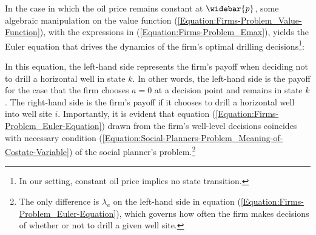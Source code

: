In the case in which the oil price remains constant at $\widebar{p}$, some algebraic manipulation on the value function (\ref{Equation:Firms-Problem_Value-Function}), with the expressions in (\ref{Equation:Firms-Problem_Emax}), yields the Euler equation that drives the dynamics of the firm's optimal drilling decisions\footnote{In our setting, constant oil price implies no state transition.}:

In this equation, the left-hand side represents the firm's payoff when deciding not to drill a horizontal well in state $k$. In other words, the left-hand side is the payoff for the case that the firm chooses $a = 0$ at a decision point and remains in state $k$. The right-hand side is the firm's payoff if it chooses to drill a horizontal well into well site $i$. Importantly, it is evident that equation (\ref{Equation:Firms-Problem_Euler-Equation}) drawn from the firm's well-level decisions coincides with necessary condition (\ref{Equation:Social-Planners-Problem_Meaning-of-Costate-Variable}) of the social planner's problem.\footnote{The only difference is $\lambda_{a}$ on the left-hand side in equation (\ref{Equation:Firms-Problem_Euler-Equation}), which governs how often the firm makes decisions of whether or not to drill a given well site.}
